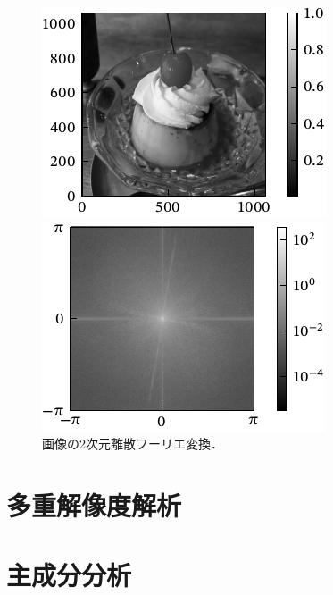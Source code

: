 \documentclass[../../main]{subfiles}
\begin{document}
\begin{figure}[htbp]
  \begin{minipage}{\linewidth/2}
    \centering
    \includegraphics{figures/pudding.pdf}
  \end{minipage}%
  \begin{minipage}{\linewidth/2}
    \centering
    \includegraphics{figures/pudding_dft.pdf}
  \end{minipage}
  \caption{画像の2次元離散フーリエ変換．}
\end{figure}

\section{多重解像度解析}

\section{主成分分析}
\end{document}
